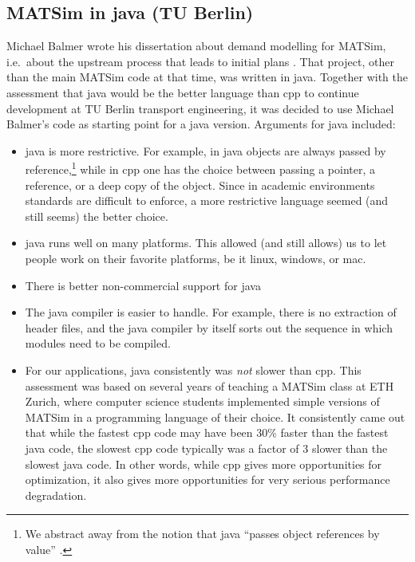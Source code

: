 \subsection{MATSim in \gls{java} (TU Berlin)}
\label{sec:matsim-in-java}

Michael Balmer wrote his dissertation about demand modelling for MATSim, i.e.\ about the upstream process that leads to initial plans
\citep{Balmer2007phd}.  That project, other than the main MATSim code at that time, was written in \gls{java}.  Together with the assessment that \gls{java} would be the better language than \gls{cpp} to continue development at TU Berlin transport engineering, it was decided to use Michael Balmer's code as starting point for a \gls{java} version.  Arguments for \gls{java} included:
\begin{itemize}

\item  \gls{java} is more restrictive.  For example, in \gls{java} objects are always passed by reference,\footnote{%
%
We abstract away from the notion that \gls{java} ``passes object references by value'' \citep{...}.
%
} while in \gls{cpp} one has the choice between passing a pointer, a reference, or a deep copy of the object.  Since in academic environments standards are difficult to enforce, a more restrictive language seemed (and still seems) the better choice.

\item \gls{java} runs well on many platforms.  This allowed (and still allows) us to let people work on their favorite platforms, be it linux, windows, or mac.

\item There is better non-commercial support for \gls{java} 

\item The \gls{java} compiler is easier to handle.  For example, there is no extraction of header files, and the \gls{java} compiler by itself sorts out the sequence in which modules need to be compiled.

\item For our applications, \gls{java} consistently was \emph{not} slower than \gls{cpp}.  This assessment was based on several years of teaching a MATSim class at ETH Zurich, where computer science students implemented simple versions of MATSim in a programming language of their choice.  It consistently came out that while the fastest \gls{cpp} code may have been 30\% faster than the fastest \gls{java} code, the slowest \gls{cpp} code typically was a factor of 3 slower than the slowest \gls{java} code.  In other words, while \gls{cpp} gives more opportunities for optimization, it also gives more opportunities for very serious performance degradation.


\end{itemize}
